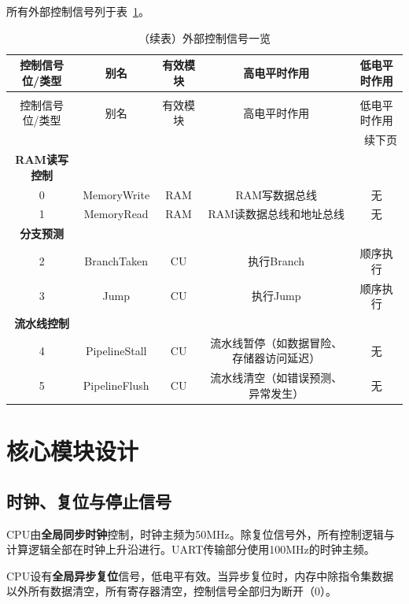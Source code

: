 \documentclass[lang=cn,a4paper,newtx]{elegantpaper}
\begin{document}
所有外部控制信号列于表~\ref{tab:CPU:ExternalControl}。
\begin{longtable}{c c c c c}
  \caption{外部控制信号一览} \label{tab:CPU:ExternalControl} \\
  \toprule
  控制信号位/类型 & 别名  & 有效模块 & 高电平时作用 & 低电平时作用\\
  \midrule
  \endfirsthead

  \caption[]{（续表）外部控制信号一览} \\
  \toprule
  控制信号位/类型 & 别名  & 有效模块 & 高电平时作用 & 低电平时作用 \\
  \midrule
  \endhead

  \midrule
  \multicolumn{5}{r}{续下页} \\
  \midrule
  \endfoot

  \bottomrule
  \endlastfoot
  \textbf{RAM读写控制}\\
  \hline
  0  & MemoryWrite    & RAM  & RAM写数据总线 & 无\\
  1  & MemoryRead     & RAM  & RAM读数据总线和地址总线 & 无\\
  \hline
  \textbf{分支预测} \\
  \hline
  2   & BranchTaken    & CU   & 执行Branch     & 顺序执行 \\
  3   & Jump            & CU  & 执行Jump        & 顺序执行 \\
  \hline
  \textbf{流水线控制}  \\
  \hline
  4   & PipelineStall & CU    & 流水线暂停（如数据冒险、存储器访问延迟） & 无 \\
  5   & PipelineFlush & CU    & 流水线清空（如错误预测、异常发生）      & 无 \\

\end{longtable}

\section{核心模块设计}
\subsection{时钟、复位与停止信号}
CPU由\textbf{全局同步时钟}控制，时钟主频为50MHz。除复位信号外，所有控制逻辑与计算逻辑全部在时钟上升沿进行。UART传输部分使用100MHz的时钟主频。

CPU设有\textbf{全局异步复位}信号，低电平有效。当异步复位时，内存中除指令集数据以外所有数据清空，所有寄存器清空，控制信号全部归为断开（0）。
\end{document}
